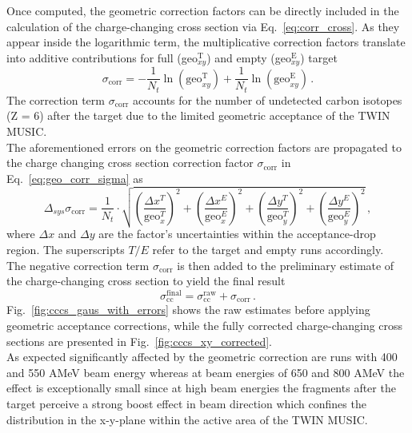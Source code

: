 Once computed, the geometric correction factors can be directly included in the calculation of the charge-changing cross section via Eq.~\ref{eq:corr_cross}. As they appear inside the logarithmic term, the multiplicative correction factors translate into additive contributions for full (geo$_{xy}^{\text{T}}$) and empty (geo$_{xy}^{\text{E}}$) target
\begin{equation}
\sigma_{\text{corr}} = -\frac{1}{N_t} \ln(\text{geo}_{xy}^{\text{T}}) + \frac{1}{N_t} \ln(\text{geo}_{xy}^{\text{E}}) \, .
\label{eq:geo_corr_sigma}
\end{equation}
The correction term $\sigma_{\text{corr}}$ accounts for the number of undetected carbon isotopes (Z = 6) after the target due to the limited geometric acceptance of the TWIN MUSIC.\\
The aforementioned errors on the geometric correction factors are propagated to the charge changing cross section correction factor $\sigma_{\text{corr}}$ in Eq.~\ref{eq:geo_corr_sigma} as
\begin{equation}
\Delta_{sys}\sigma_{\text{corr}} = \frac{1}{N_t} \cdot \sqrt{ \left(\frac{\Delta x^T}{\text{geo}_{x}^T} \right)^2 + \left(\frac{\Delta x^E}{\text{geo}_{x}^E} \right)^2 + \left(\frac{\Delta y^T}{\text{geo}_{y}^T} \right)^2 + \left(\frac{\Delta y^E}{\text{geo}_{y}^E} \right)^2 } \, , 
\end{equation}
where $\Delta x$ and $\Delta y$ are the factor's uncertainties within the acceptance-drop region. The superscripts $T/E$ refer to the target and empty runs accordingly. \\ 
The negative correction term $\sigma_{\text{corr}}$ is then added to the preliminary estimate of the charge-changing cross section to yield the final result
\begin{equation}
\sigma_{\text{cc}}^{\text{final}} = \sigma_{\text{cc}}^{\text{raw}} + \sigma_{\text{corr}} \, .
\end{equation}
Fig.~\ref{fig:cccs_gaus_with_errors} shows the raw estimates before applying geometric acceptance corrections, while the fully corrected charge-changing cross sections are presented in Fig.~\ref{fig:cccs_xy_corrected}.\\
As expected significantly affected by the  geometric correction are runs with 400 and 550 AMeV beam energy whereas at beam energies of 650 and 800 AMeV the effect is exceptionally small since at high beam energies  the fragments after the target perceive a strong boost effect in beam direction which confines the distribution in the x-y-plane within the active area of the TWIN MUSIC.

